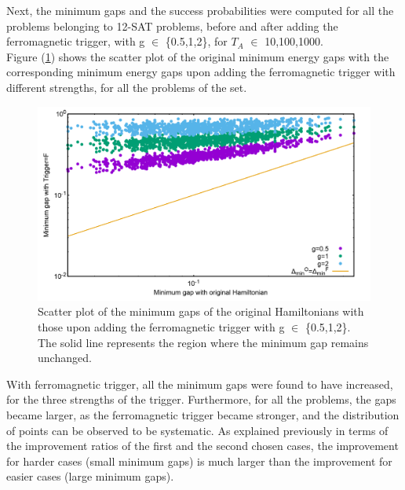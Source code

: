 \documentclass[12]{article}
\begin{document}
Next, the minimum gaps and the success probabilities were computed for all the problems belonging to 12-SAT problems, before and after adding the ferromagnetic trigger, with g $\in$ \{0.5,1,2\}, for $T_A$ $\in$ {10,100,1000}. \\

Figure (\ref{fig:f10}) shows the scatter plot of the original minimum energy gaps with the corresponding minimum energy gaps upon adding the ferromagnetic trigger with different strengths, for all the problems of the set.

\begin{figure}[H]
\centering 
\includegraphics[scale=0.25]{Mingap_F_g0_1_2.png}
\caption{Scatter plot of the minimum gaps of the original Hamiltonians with those upon adding the ferromagnetic trigger with g $\in$ \{0.5,1,2\}. The solid line represents the region where the minimum gap remains unchanged.}
\label{fig:f10}
\end{figure}
With ferromagnetic trigger, all the minimum gaps were found to have increased, for  the three strengths of the trigger. Furthermore, for all the problems, the gaps became larger, as the ferromagnetic trigger became stronger, and the distribution of points can be observed to be systematic. As explained previously in terms of the improvement ratios of the first and the second chosen cases, the improvement for harder cases (small minimum gaps) is much larger than the improvement for easier cases (large minimum gaps).
\end{document}
